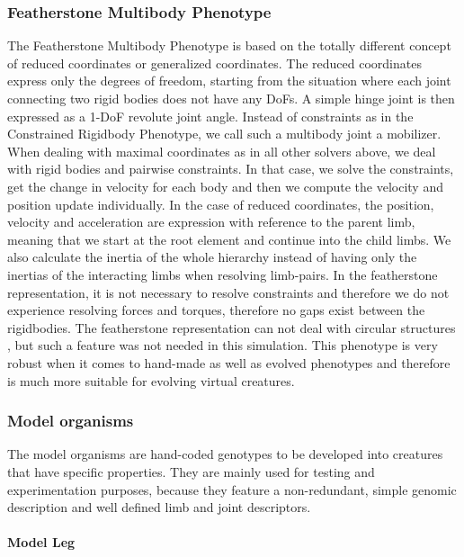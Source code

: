 \documentclass[main]{subfiles}
\begin{document}
\subsubsection{Featherstone Multibody Phenotype}

The Featherstone Multibody Phenotype is based on the totally different concept of reduced coordinates or generalized coordinates. The reduced coordinates express only the degrees of freedom, starting from the situation where each joint connecting two rigid bodies does not have any DoFs. A simple hinge joint is then expressed as a 1-DoF revolute joint angle. Instead of constraints as in the Constrained Rigidbody Phenotype, we call such a multibody joint a mobilizer. When dealing with maximal coordinates as in all other solvers above, we deal with rigid bodies and pairwise constraints. In that case, we solve the constraints, get the change in velocity for each body and then we compute the velocity and position update individually. In the case of reduced coordinates, the position, velocity and acceleration are expression with reference to the parent limb, meaning that we start at the root element and continue into the child limbs. We also calculate the inertia of the whole hierarchy instead of having only the inertias of the interacting limbs when resolving limb-pairs. In the featherstone representation, it is not necessary to resolve constraints and therefore we do not experience resolving forces and torques, therefore no gaps exist between the rigidbodies. The featherstone representation can not deal with circular structures \cite{bib::Coumans2014}, but such a feature was not needed in this simulation. This phenotype is very robust when it comes to hand-made as well as evolved phenotypes and therefore is much more suitable for evolving virtual creatures. 

\subsubsection{Model organisms}

The model organisms are hand-coded genotypes to be developed into creatures that have specific properties. They are mainly used for testing and experimentation purposes, because they feature a non-redundant, simple genomic description and well defined limb and joint descriptors.

\paragraph{Model Leg}
\end{document}
